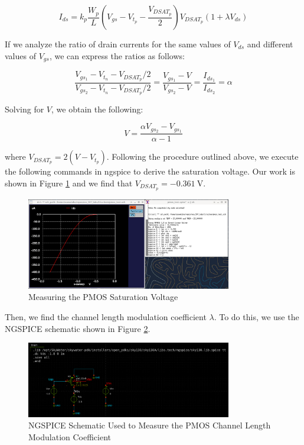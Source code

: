 \documentclass[fleqn]{article}
\begin{document}
	\begin{equation}
		\label{eq::pmos_sat_current}
		I_{ds} = k_p\frac{W_p}{L}\left(V_{gs} - V_{t_p} - \frac{V_{DSAT_p}}{2}\right)V_{DSAT_p}(1 + {\lambda}V_{ds})
	\end{equation}
	
	\noindent If we analyze the ratio of drain currents for the same values of $V_{ds}$ and different values of $V_{gs}$, we can express the ratios as follows:
	
	\begin{equation}
		\frac{V_{gs_1} - V_{t_n} - V_{DSAT_p}/2}{V_{gs_2} - V_{t_n} - V_{DSAT_p}/2} = \frac{V_{gs_1} - V}{V_{gs_2} - V} = \frac{I_{ds_1}}{I_{ds_2}} = \alpha
	\end{equation}
	
	\noindent Solving for $V$, we obtain the following:
	
	\begin{equation}
		V = \frac{{\alpha}V_{gs_2} - V_{gs_1}}{\alpha - 1}
	\end{equation}
	
	\noindent where $V_{DSAT_p} = 2(V - V_{t_p})$. Following the procedure outlined above, we execute the following commands in ngspice to derive the saturation voltage. Our work is shown in Figure \ref{fig::pmos_vdsat_meas} and we find that $V_{DSAT_p} = -0.361\ \text{V}$.
	
	\begin{figure}[H]
		\centerline{\includegraphics[width=0.8\textwidth]{pmos_vdsat_meas.png}}
		\caption{Measuring the PMOS Saturation Voltage}
		\label{fig::pmos_vdsat_meas}
	\end{figure}
	
	Then, we find the channel length modulation coefficient $\lambda$. To do this, we use the NGSPICE schematic shown in Figure \ref{fig::pmos_lambda_meas_schem}.
	
	\begin{figure}[H]
		\centerline{\includegraphics[width=0.8\textwidth]{pmos_lambda_meas_schem.png}}
		\caption{NGSPICE Schematic Used to Measure the PMOS Channel Length Modulation Coefficient}
		\label{fig::pmos_lambda_meas_schem}
	\end{figure}
	
\end{document}
